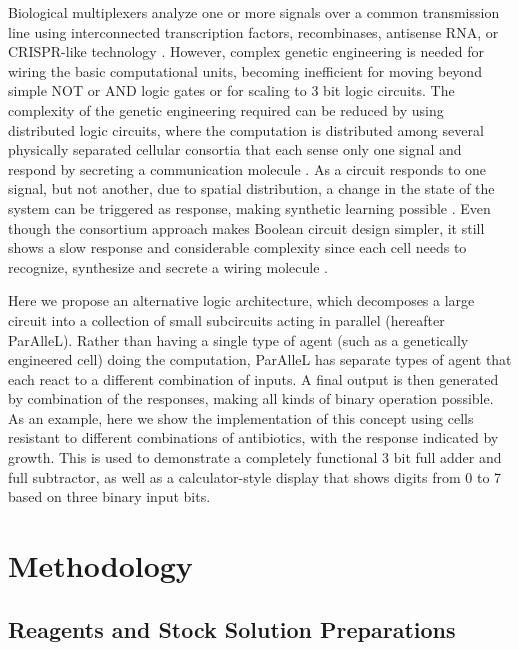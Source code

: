 Biological multiplexers analyze one or more signals over a common transmission line using interconnected transcription factors, recombinases, antisense RNA, or CRISPR-like technology \cite{nielsen2014multi,roquet2016synthetic,brenner2018synthetic}. However, complex genetic engineering is needed for wiring the basic computational units, becoming inefficient for moving beyond simple NOT or AND logic gates or for scaling to 3 bit logic circuits. The complexity of the genetic engineering required can be reduced by using distributed logic circuits, where the computation is distributed among several physically separated cellular consortia that each sense only one signal and respond by secreting a communication molecule \cite{regot2011distributed}. As a circuit responds to one signal, but not another, due to spatial distribution, a change in the state of the system can be triggered as response, making synthetic learning possible \cite{macia2017synthetic,shipman2017crispr}. Even though the consortium approach makes Boolean circuit design simpler, it still shows a slow response and considerable complexity since each cell needs to recognize, synthesize and secrete a wiring molecule \cite{macia2016implementation}.

Here we propose an alternative logic architecture, which decomposes a large circuit into a collection of small subcircuits acting in parallel (hereafter ParAlleL). Rather than having a single type of agent (such as a genetically engineered cell) doing the computation, ParAlleL has separate types of agent that each react to a different combination of inputs. A final output is then generated by combination of the responses, making all kinds of binary operation possible. As an example, here we show the implementation of this concept using cells resistant to different combinations of antibiotics, with the response indicated by growth. This is used to demonstrate a completely functional 3 bit full adder and full subtractor, as well as a calculator-style display that shows digits from 0 to 7 based on three binary input bits.

\section{\textbf{Methodology }}

\subsection{\textbf{Reagents and Stock Solution Preparations}}

